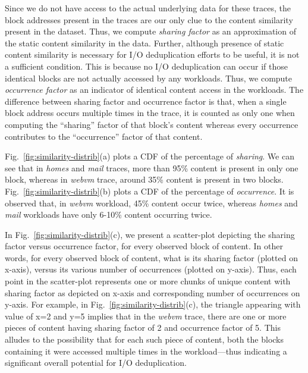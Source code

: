 Since we do not have access to the actual underlying data for these traces, 
the block addresses present in the traces are our only clue to the content similarity 
present in the dataset. Thus, we compute \textit{sharing factor} as an approximation 
of the static content similarity in the data. 
Further, although presence of static content similarity is necessary for I/O 
deduplication efforts to be useful, it is not a sufficient condition. This is 
because no I/O deduplication can occur if those identical blocks are not actually 
accessed by any workloads. Thus, we compute \textit{occurrence factor} as an indicator 
of identical content access in the workloads.
The difference between sharing factor and occurrence factor is that, 
when a single block address occurs multiple times in the trace, it is counted as 
only one when computing the ``sharing'' factor of that block's content whereas 
every occurrence contributes to the ``occurrence'' factor of that content. 


Fig.~\ref{fig:similarity-distrib}(a) plots a CDF of the percentage of \textit{sharing}.
We can see that in \textit{homes} and
\textit{mail} traces, more than 95\% content is present in only one block, whereas
in \textit{webvm} trace, around 35\% content is present in two blocks.
Fig.~\ref{fig:similarity-distrib}(b) plots a CDF of the percentage of \textit{occurrence}.
It is observed that,
in \textit{webvm} workload, 45\% content occur twice,
whereas \textit{homes} and \textit{mail} workloads have only 6-10\% content
occurring twice.

In Fig.~\ref{fig:similarity-distrib}(c), we present a scatter-plot depicting
the sharing factor versus occurrence factor, for every observed block of content.
In other words, for every observed block of content, 
what is its sharing factor (plotted on x-axis), 
versus its various number of occurrences (plotted on y-axis).
Thus, each point in the scatter-plot represents one or more chunks of unique
content with sharing factor as depicted on x-axis and corresponding
number of occurrences on y-axis. For example, in Fig.~\ref{fig:similarity-distrib}(c),
the triangle appearing with value of x=2 and y=5 implies that in the 
\textit{webvm} trace, there are one or more pieces of content having
sharing factor of 2 and occurrence factor of 5. This alludes to the possibility
that for each such piece of content, both the blocks containing it 
were accessed multiple times in the workload---thus
indicating a significant overall potential for I/O deduplication.

